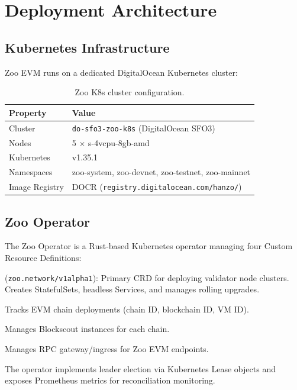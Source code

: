 \section{Deployment Architecture}


\subsection{Kubernetes Infrastructure}

Zoo EVM runs on a dedicated DigitalOcean Kubernetes cluster:

\begin{table}[h]
\centering
\begin{tabular}{ll}
\toprule
\textbf{Property} & \textbf{Value} \\
\midrule
Cluster & \texttt{do-sfo3-zoo-k8s} (DigitalOcean SFO3) \\
Nodes & 5 $\times$ s-4vcpu-8gb-amd \\
Kubernetes & v1.35.1 \\
Namespaces & zoo-system, zoo-devnet, zoo-testnet, zoo-mainnet \\
Image Registry & DOCR (\texttt{registry.digitalocean.com/hanzo/}) \\
\bottomrule
\end{tabular}
\caption{Zoo K8s cluster configuration.}
\end{table}

\subsection{Zoo Operator}

The Zoo Operator is a Rust-based Kubernetes operator managing four Custom Resource Definitions:

\begin{description}[nosep]
  \item[ZooNetwork] (\texttt{zoo.network/v1alpha1}): Primary CRD for deploying validator node clusters. Creates StatefulSets, headless Services, and manages rolling upgrades.
  \item[ZooChain] Tracks EVM chain deployments (chain ID, blockchain ID, VM ID).
  \item[ZooExplorer] Manages Blockscout instances for each chain.
  \item[ZooGateway] Manages RPC gateway/ingress for Zoo EVM endpoints.
\end{description}

The operator implements leader election via Kubernetes Lease objects and exposes Prometheus metrics for reconciliation monitoring.

